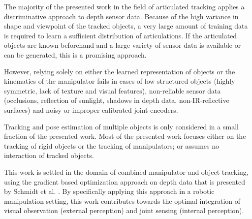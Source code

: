 The majority of the presented work in the field of articulated tracking applies a discriminative approach to depth sensor data. Because of the high variance in shape and viewpoint of the tracked objects, a very large amount of training data is required to learn a sufficient distribution of articulations. If the articulated objects are known beforehand and a large variety of sensor data is available or can be generated, this is a promising approach.

However, relying solely on either the learned representation of objects or the kinematics of the manipulator fails in cases of low structured objects (highly symmetric, lack of texture and visual features), non-reliable sensor data (occlusions, reflection of sunlight, shadows in depth data, non-IR-reflective surfaces) and noisy or improper calibrated joint encoders.

Tracking and pose estimation of multiple objects is only considered in a small fraction of the presented work. Most of the presented work focuses either on the tracking of rigid objects or the tracking of manipulators; or assumes no interaction of tracked objects.

This work is settled in the domain of combined manipulator and object tracking, using the gradient based optimization approach on depth data that is presented by Schmidt et al. \cite{Schmidt2015}.
By specifically applying this approach in a robotic manipulation setting, this work contributes towards the optimal integration of visual observation (external perception) and joint sensing (internal perception).
